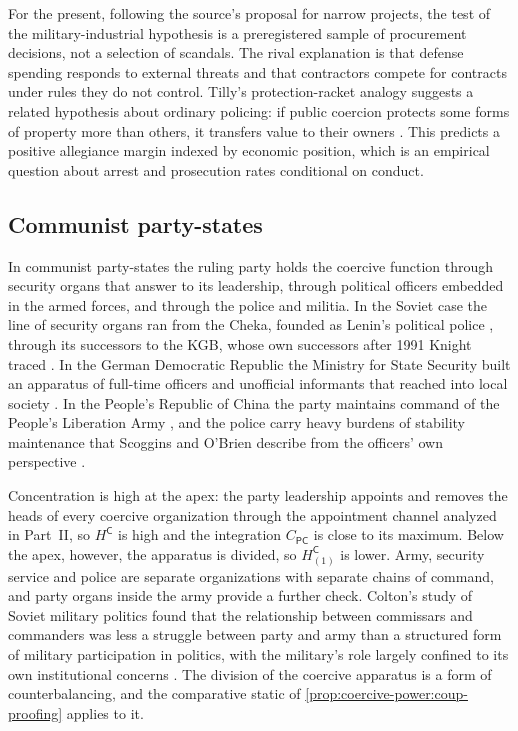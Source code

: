\documentclass[11pt,letterpaper]{article}
\theoremstyle{definition}
\theoremstyle{remark}
\newcommand{\pP}{\mathsf{P}}
\newcommand{\pC}{\mathsf{C}}
\begin{document}
For the present, following the source's proposal for narrow projects, the test of the military-industrial hypothesis is a preregistered sample of procurement decisions, not a selection of scandals. The rival explanation is that defense spending responds to external threats and that contractors compete for contracts under rules they do not control. Tilly's protection-racket analogy suggests a related hypothesis about ordinary policing: if public coercion protects some forms of property more than others, it transfers value to their owners \citep{tilly1985}. This predicts a positive allegiance margin indexed by economic position, which is an empirical question about arrest and prosecution rates conditional on conduct.

\subsection{Communist party-states}
\label{sec:communist}

In communist party-states the ruling party holds the coercive function through security organs that answer to its leadership, through political officers embedded in the armed forces, and through the police and militia. In the Soviet case the line of security organs ran from the Cheka, founded as Lenin's political police \citep{leggett1981}, through its successors to the KGB, whose own successors after 1991 Knight traced \citep{knight1996}. In the German Democratic Republic the Ministry for State Security built an apparatus of full-time officers and unofficial informants that reached into local society \citep{gieseke2014,bruce2010,koehler1999}. In the People's Republic of China the party maintains command of the People's Liberation Army \citep{shambaugh2002}, and the police carry heavy burdens of stability maintenance that Scoggins and O'Brien describe from the officers' own perspective \citep{scoggins2016}.

Concentration is high at the apex: the party leadership appoints and removes the heads of every coercive organization through the appointment channel analyzed in Part~II, so $H^{\pC}$ is high and the integration $C_{\pP\pC}$ is close to its maximum. Below the apex, however, the apparatus is divided, so $H^{\pC}_{(1)}$ is lower. Army, security service and police are separate organizations with separate chains of command, and party organs inside the army provide a further check. Colton's study of Soviet military politics found that the relationship between commissars and commanders was less a struggle between party and army than a structured form of military participation in politics, with the military's role largely confined to its own institutional concerns \citep{colton1979}. The division of the coercive apparatus is a form of counterbalancing, and the comparative static of \cref{prop:coercive-power:coup-proofing} applies to it.
\end{document}
